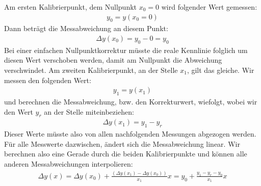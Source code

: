 \documentclass[letterpaper,10pt,english]{jupyterBook}
\begin{document}
\sphinxAtStartPar
Am ersten Kalibrierpunkt, dem Nullpunkt \(x_0 = 0\) wird folgender Wert gemessen:
\begin{equation*}
\begin{split}y_0 = y(x_0 = 0)\end{split}
\end{equation*}
\sphinxAtStartPar
Dann beträgt die Messabweichung an diesem Punkt:
\begin{equation*}
\begin{split}\Delta y(x_0) = y_0 - 0 = y_0\end{split}
\end{equation*}
\sphinxAtStartPar
Bei einer einfachen Nullpunktkorrektur müsste die reale Kennlinie folglich um diesen Wert verschoben werden, damit am Nullpunkt die Abweichung verschwindet. Am zweiten Kalibrierpunkt, an der Stelle \(x_1\), gilt das gleiche. Wir messen den folgenden Wert:
\begin{equation*}
\begin{split}y_1 = y(x_1)\end{split}
\end{equation*}
\sphinxAtStartPar
und berechnen die Messabweichung, bzw. den Korrekturwert, wiefolgt, wobei wir den  Wert \(y_r\) an der Stelle miteinbeziehen:
\begin{equation*}
\begin{split}\Delta y(x_1) = y_1 - y_r\end{split}
\end{equation*}
\sphinxAtStartPar
Dieser Werte müsste also von allen nachfolgenden Messungen abgezogen werden.
Für alle Messwerte dazwischen, ändert sich die Messabweichung linear. Wir berechnen also eine Gerade durch die beiden Kalibrierpunkte und können alle anderen Messabweichungen interpolieren:
\begin{equation*}
\begin{split}\Delta y(x) = \Delta y(x_0) + \frac{(\Delta y(x_1) - \Delta y(x_0))}{x_1} x = y_0 + \frac{y_1 - y_r - y_0}{x_1} x\end{split}
\end{equation*}
\end{document}
